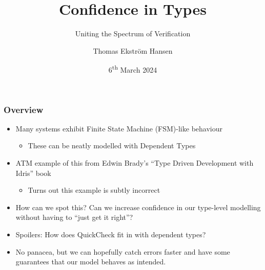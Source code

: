 \documentclass[compress,handout]{beamer}
\title{Confidence in Types}
\subtitle{Uniting the Spectrum of Verification}
\author{Thomas Ekstr{\" o}m Hansen}
\date{6\textsuperscript{th} March 2024}
\begin{document}
\maketitle


\begin{frame}
  \frametitle{Overview}

  \begin{itemize}
    \item<1-> Many systems exhibit Finite State Machine (FSM)-like behaviour
    \begin{itemize}
      \item<1-> These can be neatly modelled with Dependent Types
    \end{itemize}
    \item<2-> ATM example of this from Edwin Brady's ``Type Driven
              Development with Idris'' book
    \begin{itemize}
      \item<2-> Turns out this example is subtly incorrect
    \end{itemize}
    \item<3-> How can we spot this? Can we increase confidence in our type-level
              modelling without having to ``just get it right''?
    \item<4-> Spoilers: How does QuickCheck fit in with dependent types?
    \item<5-> No panacea, but we can hopefully catch errors faster and have some
              guarantees that our model behaves as intended.
  \end{itemize}

\end{frame}
\end{document}
